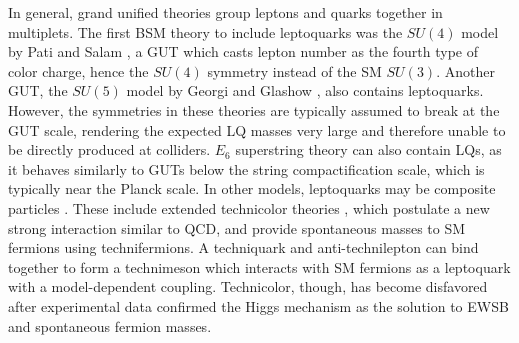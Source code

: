 In general, grand unified theories group leptons and quarks together in multiplets. The first BSM theory to include leptoquarks was the $SU(4)$ model by Pati and Salam \cite{SU4}, a GUT which casts lepton number as the fourth type of color charge, hence the $SU(4)$ symmetry instead of the SM $SU(3)$. Another GUT, the $SU(5)$ model by Georgi and Glashow \cite{GUT}, also contains leptoquarks. However, the symmetries in these theories are typically assumed to break at the GUT scale, rendering the expected LQ masses very large and therefore unable to be directly produced at colliders. $E_6$ superstring theory \cite{SUPERSTR} can also contain LQs, as it behaves similarly to GUTs below the string compactification scale, which is typically near the Planck scale. In other models, leptoquarks may be composite particles \cite{LQ3b}. These include extended technicolor theories \cite{TC3}, which postulate a new strong interaction similar to QCD, and provide spontaneous masses to SM fermions using technifermions. A techniquark and anti-technilepton can bind together to form a technimeson which interacts with SM fermions as a leptoquark with a model-dependent coupling. Technicolor, though, has become disfavored after experimental data confirmed the Higgs mechanism as the solution to EWSB and spontaneous fermion masses.

